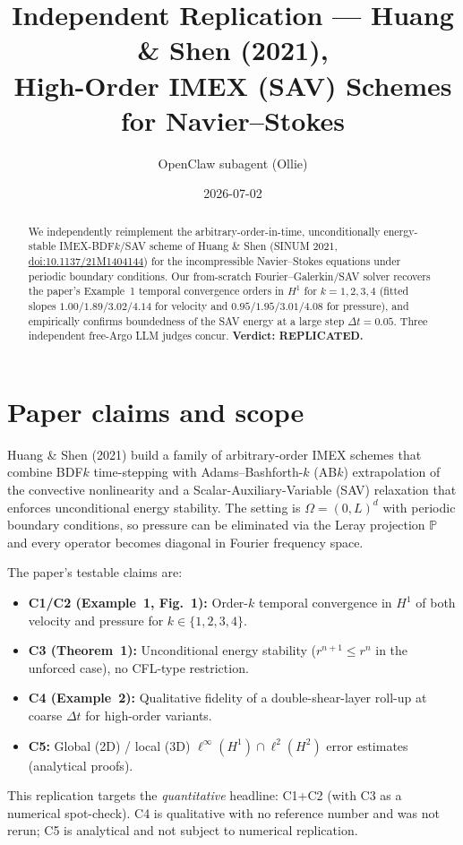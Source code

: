 \documentclass[11pt]{article}
\title{Independent Replication --- Huang \& Shen (2021),\\
High-Order IMEX (SAV) Schemes for Navier--Stokes}
\author{OpenClaw subagent (Ollie)}
\date{2026-07-02}
\begin{document}
\maketitle

\begin{abstract}
We independently reimplement the arbitrary-order-in-time, unconditionally
energy-stable IMEX-BDF$k$/SAV scheme of Huang \& Shen (SINUM 2021,
\href{https://doi.org/10.1137/21M1404144}{doi:10.1137/21M1404144}) for the
incompressible Navier--Stokes equations under periodic boundary conditions.
Our from-scratch Fourier--Galerkin/SAV solver recovers the paper's Example~1
temporal convergence orders in $H^1$ for $k=1,2,3,4$ (fitted slopes
$1.00/1.89/3.02/4.14$ for velocity and $0.95/1.95/3.01/4.08$ for pressure),
and empirically confirms boundedness of the SAV energy at a large step
$\Delta t=0.05$. Three independent free-Argo LLM judges concur.
\textbf{Verdict: REPLICATED.}
\end{abstract}

\section{Paper claims and scope}

Huang \& Shen (2021) build a family of arbitrary-order IMEX schemes that
combine BDF$k$ time-stepping with Adams--Bashforth-$k$ (AB$k$) extrapolation
of the convective nonlinearity and a Scalar-Auxiliary-Variable (SAV)
relaxation that enforces unconditional energy stability. The setting is
$\Omega=(0,L)^d$ with periodic boundary conditions, so pressure can be
eliminated via the Leray projection $\mathbb{P}$ and every operator becomes
diagonal in Fourier frequency space.

The paper's testable claims are:
\begin{itemize}[leftmargin=1.6em]
  \item \textbf{C1/C2 (Example~1, Fig.~1):} Order-$k$ temporal convergence in
        $H^1$ of both velocity and pressure for $k\in\{1,2,3,4\}$.
  \item \textbf{C3 (Theorem~1):} Unconditional energy stability
        ($r^{n+1}\le r^n$ in the unforced case), no CFL-type restriction.
  \item \textbf{C4 (Example~2):} Qualitative fidelity of a double-shear-layer
        roll-up at coarse $\Delta t$ for high-order variants.
  \item \textbf{C5:} Global (2D) / local (3D) $\ell^\infty(H^1)\cap\ell^2(H^2)$
        error estimates (analytical proofs).
\end{itemize}
This replication targets the \emph{quantitative} headline: C1+C2 (with C3
as a numerical spot-check). C4 is qualitative with no reference number and
was not rerun; C5 is analytical and not subject to numerical replication.
\end{document}
